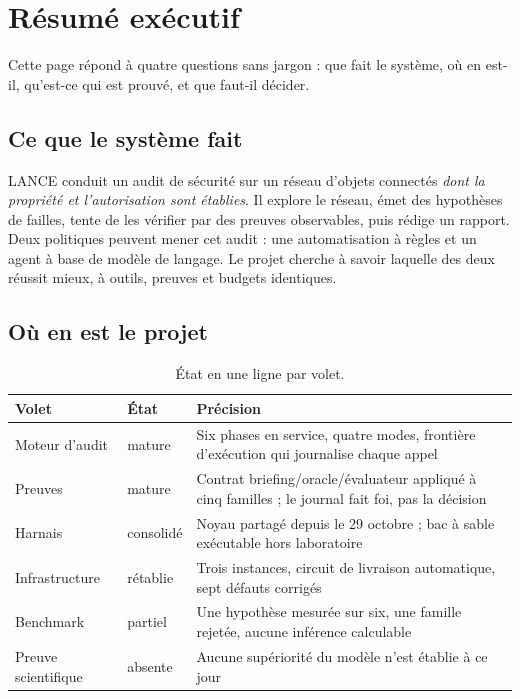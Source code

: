 \section{Résumé exécutif}

Cette page répond à quatre questions sans jargon : que fait le système, où en
est-il, qu'est-ce qui est prouvé, et que faut-il décider.

\subsection{Ce que le système fait}

LANCE conduit un audit de sécurité sur un réseau d'objets connectés \emph{dont
la propriété et l'autorisation sont établies}. Il explore le réseau, émet des
hypothèses de failles, tente de les vérifier par des preuves observables, puis
rédige un rapport. Deux politiques peuvent mener cet audit : une automatisation
à règles et un agent à base de modèle de langage. Le projet cherche à savoir
laquelle des deux réussit mieux, à outils, preuves et budgets identiques.

\subsection{Où en est le projet}

\begin{table}[H]
\centering
\caption{État en une ligne par volet.}
\label{tab:etat-volet}
\small
\begin{tabular}{@{}p{3.3cm}p{1.9cm}p{8.3cm}@{}}
\toprule
Volet & État & Précision \\
\midrule
Moteur d'audit & mature & Six phases en service, quatre modes, frontière d'exécution qui journalise chaque appel \\
Preuves & mature & Contrat briefing/oracle/évaluateur appliqué à cinq familles ; le journal fait foi, pas la décision \\
Harnais & consolidé & Noyau partagé depuis le 29 octobre ; bac à sable exécutable hors laboratoire \\
Infrastructure & rétablie & Trois instances, circuit de livraison automatique, sept défauts corrigés \\
Benchmark & partiel & Une hypothèse mesurée sur six, une famille rejetée, aucune inférence calculable \\
Preuve scientifique & absente & Aucune supériorité du modèle n'est établie à ce jour \\
\bottomrule
\end{tabular}
\end{table}

